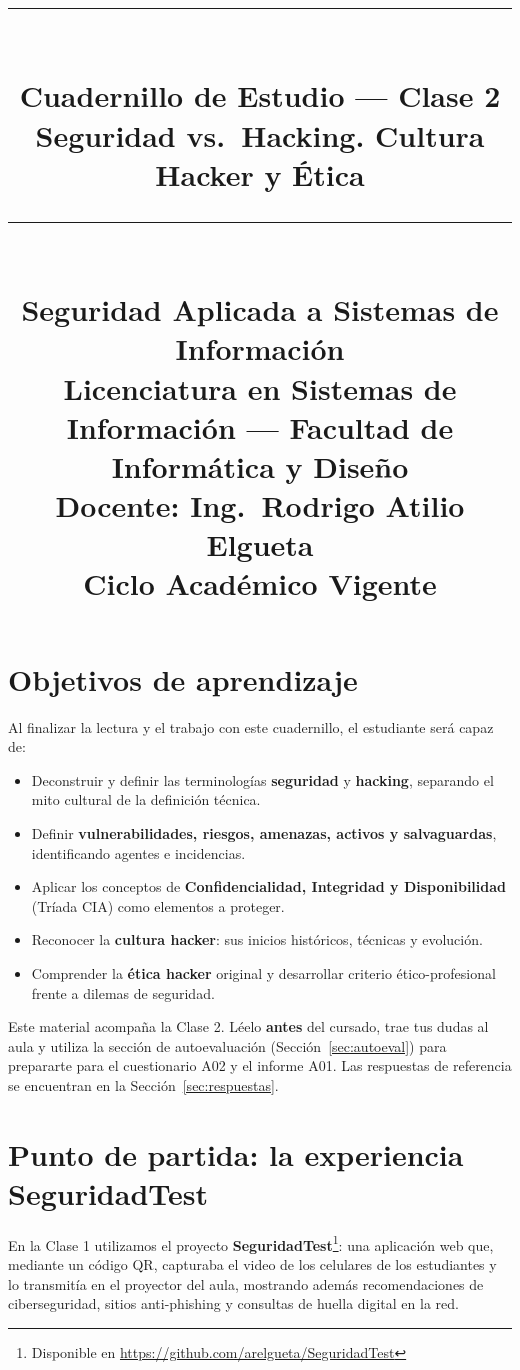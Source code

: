 \documentclass[11pt,a4paper]{article}
\title{%
  \rule{\textwidth}{1pt}\\[0.4cm]
  \textbf{\Large Cuadernillo de Estudio --- Clase 2}\\[0.2cm]
  \large Seguridad vs.\ Hacking. Cultura Hacker y Ética\\[0.2cm]
  \rule{\textwidth}{1pt}\\[0.4cm]
  \normalsize Seguridad Aplicada a Sistemas de Información\\
  Licenciatura en Sistemas de Información --- Facultad de Informática y Diseño\\
  Docente: Ing.\ Rodrigo Atilio Elgueta\\[0.2cm]
  \small Ciclo Académico Vigente
}
\author{}
\date{}
\begin{document}
\maketitle
\thispagestyle{fancy}
\tableofcontents
\newpage

\section{Objetivos de aprendizaje}
Al finalizar la lectura y el trabajo con este cuadernillo, el estudiante será capaz de:

\begin{itemize}[leftmargin=*]
  \item Deconstruir y definir las terminologías \textbf{seguridad} y \textbf{hacking}, separando el mito cultural de la definición técnica.
  \item Definir \textbf{vulnerabilidades, riesgos, amenazas, activos y salvaguardas}, identificando agentes e incidencias.
  \item Aplicar los conceptos de \textbf{Confidencialidad, Integridad y Disponibilidad} (Tríada CIA) como elementos a proteger.
  \item Reconocer la \textbf{cultura hacker}: sus inicios históricos, técnicas y evolución.
  \item Comprender la \textbf{ética hacker} original y desarrollar criterio ético-profesional frente a dilemas de seguridad.
\end{itemize}

\begin{clave}
Este material acompaña la Clase 2. Léelo \textbf{antes} del cursado, trae tus dudas al aula y utiliza la sección de autoevaluación (Sección~\ref{sec:autoeval}) para prepararte para el cuestionario A02 y el informe A01. Las respuestas de referencia se encuentran en la Sección~\ref{sec:respuestas}.
\end{clave}

\section{Punto de partida: la experiencia SeguridadTest}
En la Clase 1 utilizamos el proyecto \textbf{SeguridadTest}\footnote{Disponible en \url{https://github.com/arelgueta/SeguridadTest}}: una aplicación web que, mediante un código QR, capturaba el video de los celulares de los estudiantes y lo transmitía en el proyector del aula, mostrando además recomendaciones de ciberseguridad, sitios anti-phishing y consultas de huella digital en la red.
\end{document}
